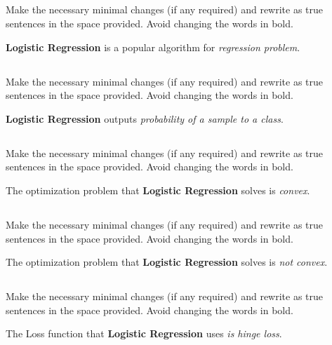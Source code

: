 \begin{frame}
\section{}
Make the necessary minimal changes  (if any required) and rewrite as true sentences in the space provided. Avoid changing the words in bold.

{\bf Logistic Regression} is a popular algorithm for {\em  regression problem}.

\end{frame}


\begin{frame}
\section{}
Make the necessary minimal changes  (if any required) and rewrite as true sentences in the space provided. Avoid changing the words in bold.

{\bf Logistic Regression} outputs {\em probability of a sample to a class}.

\end{frame}


\begin{frame}
\section{}
Make the necessary minimal changes  (if any required) and rewrite as true sentences in the space provided. Avoid changing the words in bold.


The optimization problem that {\bf Logistic Regression} solves is {\em convex}.
\end{frame}


\begin{frame}
\section{}
Make the necessary minimal changes  (if any required) and rewrite as true sentences in the space provided. Avoid changing the words in bold.

The optimization problem that {\bf Logistic Regression} solves is {\em not convex}.
\end{frame}


\begin{frame}
\section{}
Make the necessary minimal changes  (if any required) and rewrite as true sentences in the space provided. Avoid changing the words in bold.

The Loss function that {\bf Logistic Regression} uses {\em is hinge loss}.
\end{frame}

